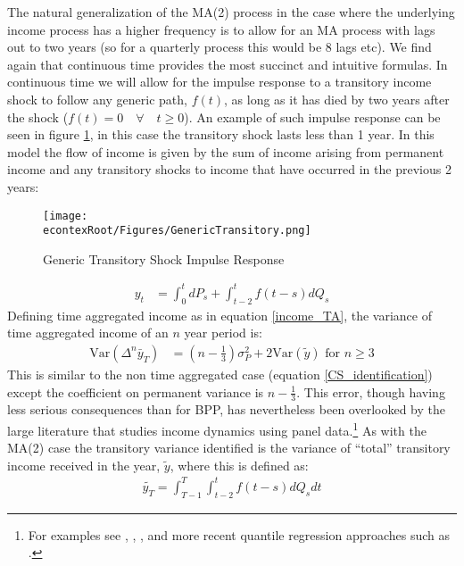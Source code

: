 \documentclass[titlepage]{\econtex}\newcommand{\texname}{IncomeUncertainty}
\begin{document}
The natural generalization of the MA(2) process in the case where the underlying income process has a higher frequency is to allow for an MA process with lags out to two years (so for a quarterly process this would be 8 lags etc). We find again that continuous time provides the most succinct and intuitive formulas. In continuous time we will allow for the impulse response to a transitory income shock to follow any generic path, $f(t)$, as long as it has died by two years after the shock ($f(t)=0 \quad \forall \quad t \geq 0$). An example of such impulse response can be seen in figure \ref{fig:GenericTransitory}, in this case the transitory shock lasts less than 1 year. In this model the flow of income is given by the sum of income arising from permanent income and any transitory shocks to income that have occurred in the previous 2 years:
	\begin{figure} 
	\begin{centering}
		\texttt{[image: \\econtexRoot/Figures/GenericTransitory.png]} 
		\caption{Generic Transitory Shock Impulse Response}
		\label{fig:GenericTransitory}
	\end{centering}
\end{figure}
\begin{align*}
y_t &= \int_{0}^{t} dP_s + \int_{t-2}^{t} f(t-s)dQ_s
\end{align*}
Defining time aggregated income as in equation \ref{income_TA}, the variance of time aggregated income of an $n$ year period is:
	\begin{align}
\mathrm{Var}(\Delta^n \bar{y}_T) &= (n-\frac{1}{3})\sigma^2_P +  2 \mathrm{Var}(\tilde{y}) \text{   for }n \geq 3 \label{variance}
\end{align}
This is similar to the non time aggregated case (equation \ref{CS_identification}) except the coefficient on permanent variance is $n-\frac{1}{3}$. This error, though having less serious consequences than for BPP, has nevertheless been overlooked by the large literature that studies income dynamics using panel data.\footnote{For examples see \cite{moffitt_trends_2012}, \cite{meghir_income_2004}, \cite{nielsen_impact_2004}, \cite{heathcote_unequal_2010} and more recent quantile regression approaches such as \cite{arellano_earnings_2017}.} As with the MA(2) case the transitory variance identified is the variance of ``total'' transitory income received in the year, $\tilde{y}$, where this is defined as:
\begin{align}
\tilde{y_T} = \int_{T-1}^{T}\int_{t-2}^{t} f(t-s)dQ_s dt \label{tot_income}
\end{align}
\end{document}
